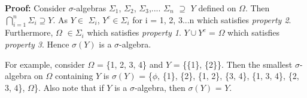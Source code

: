 \documentclass{article}
\begin{document}
\textbf{Proof: }Consider $\sigma$-algebras $\Sigma_1$, $\Sigma_2$, $\Sigma_3$,....  $\Sigma_n$ $\supseteq $ $Y$ defined on $\Omega$. Then $\bigcap\limits_{i=1}^n \Sigma_i \supseteq Y$. As $Y \in$ $\Sigma_i$, $Y^c \in \Sigma_i$ for i = 1, 2, 3...n which satisfies \textit{property 2}. Furthermore, $\Omega$ $\in \Sigma_i$ which satisfies \textit{property 1}. $Y \cup Y^c$ = $\Omega$ which satisfies \textit{property 3}. Hence $\sigma(Y)$ is a $\sigma$-algebra.

For example, consider $\Omega$ = \{1, 2, 3, 4\} and $Y$ = \{\{1\}, \{2\}\}. Then the smallest $\sigma$-algebra on $\Omega$ containing $Y$ is $\sigma(Y)$ = \{$\phi$, \{1\}, \{2\}, \{1, 2\}, \{3, 4\}, \{1, 3, 4\}, \{2, 3, 4\}, $\Omega$\}. Also note that if $Y$ is a $\sigma$-algebra, then $\sigma(Y)$ = $Y$.
\end{document}
